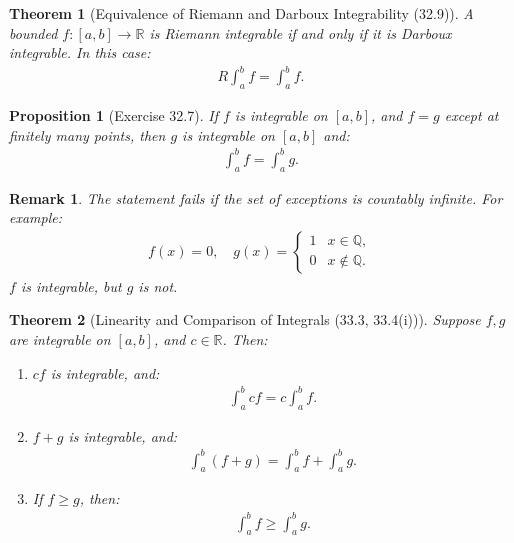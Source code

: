 \documentclass[7pt]{article}
\theoremstyle{definition}
\theoremstyle{plain}
\newtheorem{theorem}{Theorem}
\newtheorem{proposition}{Proposition}
\newtheorem{remark}{Remark}
\begin{document}
\begin{theorem}[Equivalence of Riemann and Darboux Integrability (32.9)]
A bounded $ f : [a, b] \to \mathbb{R} $ is Riemann integrable if and only if it is Darboux integrable. In this case:
\begin{align}
R\int_a^b f = \int_a^b f.
\end{align}
\end{theorem}

\begin{proposition}[Exercise 32.7]
If $ f $ is integrable on $ [a, b] $, and $ f = g $ except at finitely many points, then $ g $ is integrable on $ [a, b] $ and:
\begin{align}
\int_a^b f = \int_a^b g.
\end{align}
\end{proposition}

\begin{remark}
The statement fails if the set of exceptions is countably infinite. For example:
\begin{align}
f(x) = 0, \quad g(x) =
\begin{cases}
1 & x \in \mathbb{Q}, \\
0 & x \notin \mathbb{Q}.
\end{cases}
\end{align}
$ f $ is integrable, but $ g $ is not.
\end{remark}

\begin{theorem}[Linearity and Comparison of Integrals (33.3, 33.4(i))]
Suppose $ f, g $ are integrable on $ [a, b] $, and $ c \in \mathbb{R} $. Then:
\begin{enumerate}
    \item $ cf $ is integrable, and:
    \begin{align}
    \int_a^b cf = c \int_a^b f.
    \end{align}
    \item $ f + g $ is integrable, and:
    \begin{align}
    \int_a^b (f + g) = \int_a^b f + \int_a^b g.
    \end{align}
    \item If $ f \geq g $, then:
    \begin{align}
    \int_a^b f \geq \int_a^b g.
    \end{align}
\end{enumerate}
\end{theorem}
\end{document}
